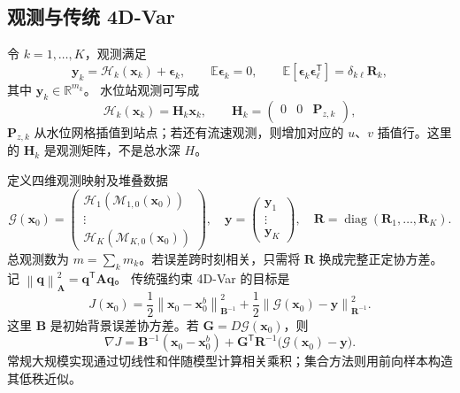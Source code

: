 \documentclass[11pt,a4paper]{article}
\newcommand{\T}{\mathsf T}
\newcommand{\R}{\mathbb R}
\newcommand{\xx}{\mathbf x}
\newcommand{\yy}{\mathbf y}
\newcommand{\norm}[2]{\left\|#1\right\|_{#2}}
\begin{document}
\subsection{观测与传统 4D-Var}

令 $k=1,\ldots,K$，观测满足
\begin{equation}
 \yy_k=\mathcal H_k(\xx_k)+\bm\epsilon_k,
 \qquad \mathbb E\bm\epsilon_k=0,\qquad
 \mathbb E[\bm\epsilon_k\bm\epsilon_\ell^\T]
 =\delta_{k\ell}\mathbf R_k,
 \label{eq:obs}
\end{equation}
其中 $\yy_k\in\R^{m_k}$。
水位站观测可写成
\begin{equation}
 \mathcal H_k(\xx_k)=\mathbf H_k\xx_k,
 \qquad \mathbf H_k=\begin{pmatrix}0&0&\mathbf P_{z,k}\end{pmatrix},
 \label{eq:heightobs}
\end{equation}
$\mathbf P_{z,k}$ 从水位网格插值到站点；若还有流速观测，则增加对应的
$u$、$v$ 插值行。这里的 $\mathbf H_k$ 是观测矩阵，不是总水深 $H$。

定义四维观测映射及堆叠数据
\begin{equation}
 \mathcal G(\xx_0)=
 \begin{pmatrix}\mathcal H_1(\mathcal M_{1,0}(\xx_0))\\\vdots\\
 \mathcal H_K(\mathcal M_{K,0}(\xx_0))\end{pmatrix},
 \quad \yy=\begin{pmatrix}\yy_1\\\vdots\\\yy_K\end{pmatrix},
 \quad \mathbf R=\operatorname{diag}(\mathbf R_1,\ldots,\mathbf R_K).
 \label{eq:stack}
\end{equation}
总观测数为 $m=\sum_k m_k$。若误差跨时刻相关，只需将 $\mathbf R$ 换成完整正定协方差。
记 $\norm{\mathbf q}{\mathbf A}^2=\mathbf q^\T\mathbf A\mathbf q$。
传统强约束 4D-Var 的目标是
\begin{equation}
 J(\xx_0)=\frac12\norm{\xx_0-\xx_0^b}{\mathbf B^{-1}}^2
 +\frac12\norm{\mathcal G(\xx_0)-\yy}{\mathbf R^{-1}}^2.
 \label{eq:4dvar}
\end{equation}
这里 $\mathbf B$ 是初始背景误差协方差。若 $\mathbf G=D\mathcal G(\xx_0)$，则
\begin{equation}
 \nabla J=\mathbf B^{-1}(\xx_0-\xx_0^b)
 +\mathbf G^\T\mathbf R^{-1}\bigl(\mathcal G(\xx_0)-\yy\bigr).
\end{equation}
常规大规模实现通过切线性和伴随模型计算相关乘积；集合方法则用前向样本构造其低秩近似。
\end{document}
